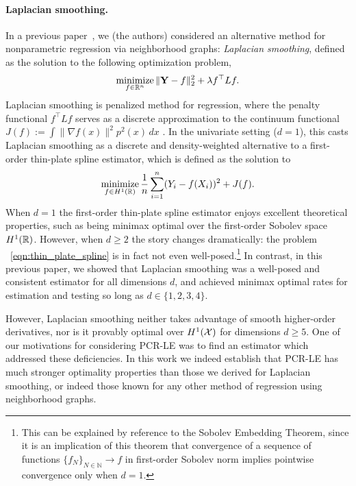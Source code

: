 \paragraph{Laplacian smoothing.}
In a previous paper~\citep{green2021}, we (the authors) considered an alternative method for nonparametric regression via neighborhood graphs: \emph{Laplacian smoothing}, defined as the solution to the following optimization problem,
\begin{equation}
\label{eqn:laplacian_smoothing}
\mathop{\mathrm{minimize}}_{f \in \mathbb{R}^n} \|{\bf Y} - f\|_2^2 + \lambda f^{\top} L f.
\end{equation}
Laplacian smoothing is penalized method for regression, where the penalty functional $f^{\top} L f$ serves as a discrete approximation to the continuum functional $J(f) := \int \|\nabla f(x)\|^2 p^2(x) \,dx$ \citep{bousquet03}. In the univariate setting ($d = 1$), this casts Laplacian smoothing as a discrete and density-weighted alternative to a first-order thin-plate spline estimator, which is defined as the solution to
\begin{equation}
\label{eqn:thin_plate_spline}
\mathop{\mathrm{minimize}}_{f \in H^1(\mathbb{R})} \frac{1}{n}\sum_{i = 1}^{n} (Y_i - f(X_i))^2 + J(f).
\end{equation}
When $d = 1$ the first-order thin-plate spline estimator enjoys excellent theoretical properties, such as being minimax optimal over the first-order Sobolev space $H^1(\mathbb{R})$. However, when $d \geq 2$ the story changes dramatically: the problem ~\eqref{eqn:thin_plate_spline} is in fact not even well-posed.\footnote{This can be explained by reference to the Sobolev Embedding Theorem, since it is an implication of this theorem that convergence of a sequence of functions $\{f_N\}_{N \in \mathbb{N}} \to f$ in first-order Sobolev norm implies pointwise convergence only when $d = 1$.} In contrast, in this previous paper, we showed that Laplacian smoothing was a well-posed and consistent estimator for all dimensions $d$, and achieved minimax optimal rates for estimation and testing so long as $d \in \{1,2,3,4\}$.

However, Laplacian smoothing neither takes advantage of smooth higher-order derivatives, nor is it provably optimal over $H^1(\mathcal{X})$ for dimensions $d \geq 5$. One of our motivations for considering PCR-LE was to find an estimator which addressed these deficiencies. In this work we indeed establish that PCR-LE has much stronger optimality properties than those we derived for Laplacian smoothing, or indeed those known for any other method of regression using neighborhood graphs. 

